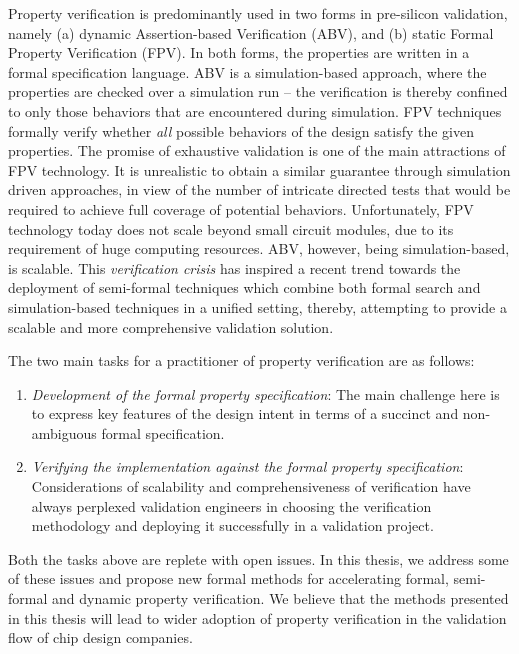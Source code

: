 \documentclass[a4paper, 11pt]{article}
\begin{document}
Property verification is predominantly used in two forms in pre-silicon
validation, namely (a) dynamic Assertion-based Verification (ABV), and 
(b) static Formal Property Verification (FPV). In both forms, the properties 
are written in a formal specification language. ABV is a simulation-based 
approach, where the properties are checked over a simulation run -- the 
verification is thereby confined to only those behaviors that are encountered 
during simulation. FPV techniques formally verify whether {\em all} possible 
behaviors of the design satisfy the given properties. The promise of 
exhaustive validation is one of the main attractions of FPV technology. It is
unrealistic to obtain a similar guarantee through simulation driven approaches,
in view of the number of intricate directed tests that would be required to
achieve full coverage of potential behaviors. Unfortunately, FPV technology 
today does not scale beyond small circuit modules, due to its requirement 
of huge computing resources. ABV, however, being simulation-based, is scalable. 
This {\em verification crisis} has inspired a recent trend 
towards the deployment of semi-formal techniques which combine both 
formal search and simulation-based techniques in a unified setting, 
thereby, attempting to provide a scalable and more comprehensive 
validation solution.

The two main tasks for a practitioner of property verification are as 
follows:
\begin{enumerate}

\item {\em Development of the formal property specification}: The main
    challenge here is to express key features of the design intent in
    terms of a succinct and non-ambiguous formal specification. 

\item {\em Verifying the implementation against the formal property
    specification}: Considerations of scalability and comprehensiveness 
	of verification have always perplexed validation engineers in 
	choosing the verification methodology 
	and deploying it successfully in a validation project.

\end{enumerate}

\noindent
Both the tasks above are replete with open issues. In this thesis, we 
address some of these issues and propose new formal methods for accelerating 
formal, semi-formal and dynamic property verification. We believe that the 
methods presented in 
this thesis will lead to wider adoption of property verification in the 
validation flow of chip design companies.
\end{document}

